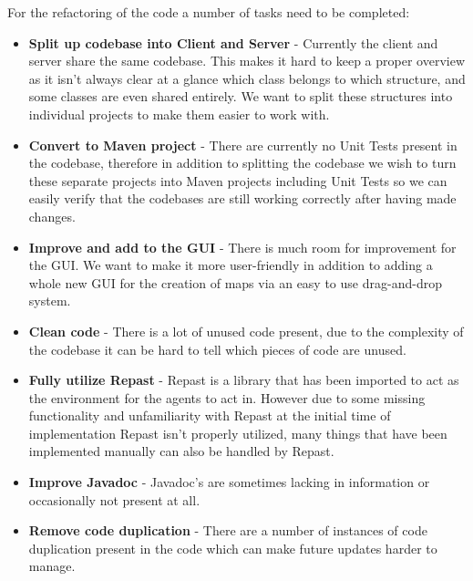 For the refactoring of the code a number of tasks need to be completed:
\begin{itemize}
  \item
  \textbf{Split up codebase into Client and Server} - Currently the client and
  server share the same codebase. This makes it hard to keep a proper overview as
  it isn't always clear at a glance which class belongs to which structure, and
  some classes are even shared entirely. We want to split these structures into
  individual projects to make them easier to work with.
  \item
  \textbf{Convert to Maven project} - There are currently no Unit Tests present
  in the codebase, therefore in addition to splitting the codebase we wish to
  turn these separate projects into Maven projects including Unit Tests so we can
  easily verify that the codebases are still working correctly after having made
  changes.
  \item
  \textbf{Improve and add to the GUI} - There is much room for improvement for
  the GUI. We want to make it more user-friendly in addition to adding a whole
  new GUI for the creation of maps via an easy to use drag-and-drop system.
  \item
  \textbf{Clean code} - There is a lot of unused code present, due to the
  complexity of the codebase it can be hard to tell which pieces of code are
  unused.
  \item
  \textbf{Fully utilize Repast} - Repast is a library that has been imported to
  act as the environment for the agents to act in. However due to some missing
  functionality and unfamiliarity with Repast at the initial time of implementation
  Repast isn't properly utilized, many things that have been implemented manually
  can also be handled by Repast.
  \item
  \textbf{Improve Javadoc} - Javadoc's are sometimes lacking in information or
  occasionally not present at all.
  \item
  \textbf{Remove code duplication} - There are a number of instances of code
  duplication present in the code which can make future updates harder to manage.
\end{itemize}
